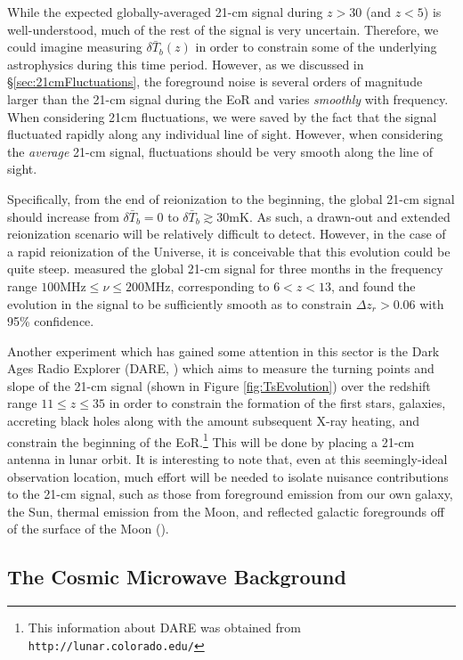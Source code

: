 While the expected globally-averaged 21-cm signal during $z > 30$ (and $z < 5$) is well-understood, much of the rest of the signal is very uncertain. Therefore, we could imagine measuring $\delta \bar{T}_{b}(z)$ in order to constrain some of the underlying astrophysics during this time period. However, as we discussed in \S \ref{sec:21cmFluctuations}, the foreground noise is several orders of magnitude larger than the 21-cm signal during the EoR and varies \textit{smoothly} with frequency. When considering 21cm fluctuations, we were saved by the fact that the signal fluctuated rapidly along any individual line of sight. However, when considering the \textit{average} 21-cm signal, fluctuations should be very smooth along the line of sight. 


Specifically, from the end of reionization to the beginning, the global 21-cm signal should increase from $\delta \bar{T}_{b} = 0$ to $\delta \bar{T}_{b} \gtrsim 30$mK. As such, a drawn-out and extended reionization scenario will be relatively difficult to detect. However, in the case of a rapid reionization of the Universe, it is conceivable that this evolution could be quite steep. \citet{bowman2010lower} measured the global 21-cm signal for three months in the frequency range $100\text{MHz} \leq \nu \leq 200\text{MHz}$, corresponding to $6 < z < 13$, and found the evolution in the signal to be sufficiently smooth as to constrain $\Delta z_{r} > 0.06$ with 95\% confidence. 


Another experiment which has gained some attention in this sector is the Dark Ages Radio Explorer (DARE, \citealt{burns2012probing}) which aims to measure the turning points and slope of the 21-cm signal (shown in Figure \ref{fig:TsEvolution}) over the redshift range $11 \leq z \leq 35$ in order to constrain the formation of the first stars, galaxies, accreting black holes along with the amount subsequent X-ray heating, and constrain the beginning of the EoR.\footnote{This information about DARE was obtained from {\tt http://lunar.colorado.edu/}} This will be done by placing a 21-cm antenna in lunar orbit. It is interesting to note that, even at this seemingly-ideal observation location, much effort will be needed to isolate nuisance contributions to the 21-cm signal, such as those from foreground emission from our own galaxy, the Sun, thermal emission from the Moon, and reflected galactic foregrounds off of the surface of the Moon (\citealt{harker2012mcmc}).

\clearpage
\subsection{The Cosmic Microwave Background}\label{sec:CMB}


